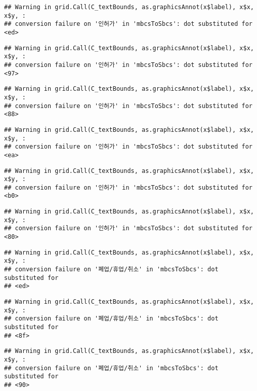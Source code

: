 \documentclass[
]{book}
\begin{document}
\begin{verbatim}
## Warning in grid.Call(C_textBounds, as.graphicsAnnot(x$label), x$x, x$y, :
## conversion failure on '인허가' in 'mbcsToSbcs': dot substituted for <ed>
\end{verbatim}

\begin{verbatim}
## Warning in grid.Call(C_textBounds, as.graphicsAnnot(x$label), x$x, x$y, :
## conversion failure on '인허가' in 'mbcsToSbcs': dot substituted for <97>
\end{verbatim}

\begin{verbatim}
## Warning in grid.Call(C_textBounds, as.graphicsAnnot(x$label), x$x, x$y, :
## conversion failure on '인허가' in 'mbcsToSbcs': dot substituted for <88>
\end{verbatim}

\begin{verbatim}
## Warning in grid.Call(C_textBounds, as.graphicsAnnot(x$label), x$x, x$y, :
## conversion failure on '인허가' in 'mbcsToSbcs': dot substituted for <ea>
\end{verbatim}

\begin{verbatim}
## Warning in grid.Call(C_textBounds, as.graphicsAnnot(x$label), x$x, x$y, :
## conversion failure on '인허가' in 'mbcsToSbcs': dot substituted for <b0>
\end{verbatim}

\begin{verbatim}
## Warning in grid.Call(C_textBounds, as.graphicsAnnot(x$label), x$x, x$y, :
## conversion failure on '인허가' in 'mbcsToSbcs': dot substituted for <80>
\end{verbatim}

\begin{verbatim}
## Warning in grid.Call(C_textBounds, as.graphicsAnnot(x$label), x$x, x$y, :
## conversion failure on '폐업/휴업/취소' in 'mbcsToSbcs': dot substituted for
## <ed>
\end{verbatim}

\begin{verbatim}
## Warning in grid.Call(C_textBounds, as.graphicsAnnot(x$label), x$x, x$y, :
## conversion failure on '폐업/휴업/취소' in 'mbcsToSbcs': dot substituted for
## <8f>
\end{verbatim}

\begin{verbatim}
## Warning in grid.Call(C_textBounds, as.graphicsAnnot(x$label), x$x, x$y, :
## conversion failure on '폐업/휴업/취소' in 'mbcsToSbcs': dot substituted for
## <90>
\end{verbatim}
\end{document}
